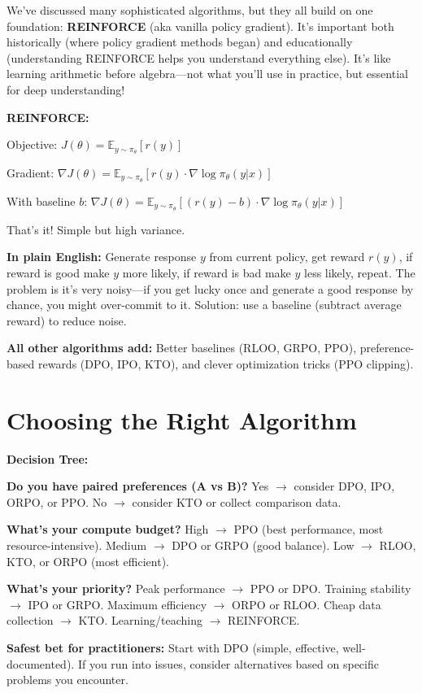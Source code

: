 \begin{chapterenv}
We've discussed many sophisticated algorithms, but they all build on one foundation: \textbf{REINFORCE} (aka vanilla policy gradient). It's important both historically (where policy gradient methods began) and educationally (understanding REINFORCE helps you understand everything else). It's like learning arithmetic before algebra---not what you'll use in practice, but essential for deep understanding!

\begin{infobox}
\textbf{REINFORCE:}

Objective: $J(\theta) = \mathbb{E}_{y \sim \pi_\theta}[r(y)]$

Gradient: $\nabla J(\theta) = \mathbb{E}_{y \sim \pi_\theta}[r(y) \cdot \nabla \log \pi_\theta(y | x)]$

With baseline $b$: $\nabla J(\theta) = \mathbb{E}_{y \sim \pi_\theta}[(r(y) - b) \cdot \nabla \log \pi_\theta(y | x)]$

That's it! Simple but high variance.

\textbf{In plain English:} Generate response $y$ from current policy, get reward $r(y)$, if reward is good make $y$ more likely, if reward is bad make $y$ less likely, repeat. The problem is it's very noisy---if you get lucky once and generate a good response by chance, you might over-commit to it. Solution: use a baseline (subtract average reward) to reduce noise.

\textbf{All other algorithms add:} Better baselines (RLOO, GRPO, PPO), preference-based rewards (DPO, IPO, KTO), and clever optimization tricks (PPO clipping).
\end{infobox}

\section{Choosing the Right Algorithm}

\begin{infobox}
\textbf{Decision Tree:}

\textbf{Do you have paired preferences (A vs B)?} Yes $\to$ consider DPO, IPO, ORPO, or PPO. No $\to$ consider KTO or collect comparison data.

\textbf{What's your compute budget?} High $\to$ PPO (best performance, most resource-intensive). Medium $\to$ DPO or GRPO (good balance). Low $\to$ RLOO, KTO, or ORPO (most efficient).

\textbf{What's your priority?} Peak performance $\to$ PPO or DPO. Training stability $\to$ IPO or GRPO. Maximum efficiency $\to$ ORPO or RLOO. Cheap data collection $\to$ KTO. Learning/teaching $\to$ REINFORCE.

\textbf{Safest bet for practitioners:} Start with DPO (simple, effective, well-documented). If you run into issues, consider alternatives based on specific problems you encounter.
\end{infobox}

\end{chapterenv}